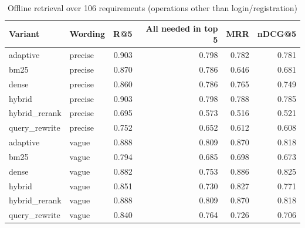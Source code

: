 \begin{table}[t]\centering\small
\caption{Offline retrieval over 106 requirements (operations other than login/registration)}
\begin{tabular}{llrrrr}
\toprule
Variant & Wording & R@5 & All needed in top 5 & MRR & nDCG@5 \\
\midrule
adaptive & precise & 0.903 & 0.798 & 0.782 & 0.781 \\
bm25 & precise & 0.870 & 0.786 & 0.646 & 0.681 \\
dense & precise & 0.860 & 0.786 & 0.765 & 0.749 \\
hybrid & precise & 0.903 & 0.798 & 0.788 & 0.785 \\
hybrid\_rerank & precise & 0.695 & 0.573 & 0.516 & 0.521 \\
query\_rewrite & precise & 0.752 & 0.652 & 0.612 & 0.608 \\
adaptive & vague & 0.888 & 0.809 & 0.870 & 0.818 \\
bm25 & vague & 0.794 & 0.685 & 0.698 & 0.673 \\
dense & vague & 0.882 & 0.753 & 0.886 & 0.825 \\
hybrid & vague & 0.851 & 0.730 & 0.827 & 0.771 \\
hybrid\_rerank & vague & 0.888 & 0.809 & 0.870 & 0.818 \\
query\_rewrite & vague & 0.840 & 0.764 & 0.726 & 0.706 \\
\bottomrule
\end{tabular}
\label{tab:retrieval}
\end{table}
